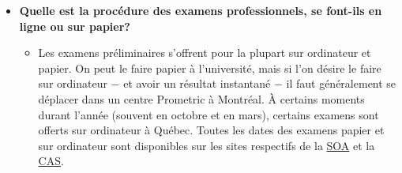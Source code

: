 \begin{itemize}
\begin{itemize}
	\end{itemize}
	\item \textbf{Quelle est la procédure des examens professionnels, se font-ils en ligne ou sur papier?}
	\begin{itemize}
	\item Les examens préliminaires s'offrent pour la plupart sur ordinateur et papier. On peut le faire papier à l'université, mais si l'on désire le faire sur ordinateur $-$ et avoir un résultat instantané $-$ il faut généralement se déplacer dans un centre Prometric à Montréal. À certains moments durant l'année (souvent en octobre et en mars), certains examens sont offerts sur ordinateur à Québec. Toutes les dates des examens papier et sur ordinateur sont disponibles sur les sites respectifs de la \href{https://www.soa.org/Education/Exam-Req/Exam-Day-Info/edu-2017-cbt-test-schedule.aspx}{SOA} et la \href{http://www.casact.org/admissions/exams/}{CAS}.
	\end{itemize}
\end{itemize}
